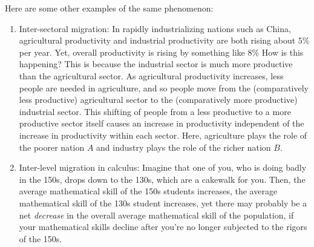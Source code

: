 \documentclass{amsart}
\begin{document}
Here are some other examples of the same phenomenon:

\begin{enumerate}
\item Inter-sectoral migration: In rapidly industrializing nations
  such as China, agricultural productivity and industrial productivity
  are both rising about $5\%$ per year. Yet, overall productivity is
  rising by something like $8\%$ How is this happening? This is
  because the industrial sector is much more productive than the
  agricultural sector. As agricultural productivity increases, less
  people are needed in agriculture, and so people move from the
  (comparatively less productive) agricultural sector to the
  (comparatively more productive) industrial sector. This shifting of
  people from a less productive to a more productive sector itself
  causes an increase in productivity independent of the increase in
  productivity within each sector. Here, agriculture plays the role of
  the poorer nation $A$ and industry plays the role of the richer
  nation $B$.
\item Inter-level migration in calculus: Imagine that one of you, who
  is doing badly in the 150s, drops down to the 130s, which are a
  cakewalk for you. Then, the average mathematical skill of the 150s
  students increases, the average mathematical skill of the 130s
  student increases, yet there may probably be a net {\em decrease} in
  the overall average mathematical skill of the population, if your
  mathematical skills decline after you're no longer subjected to the
  rigors of the 150s.
\end{enumerate}
\end{document}
